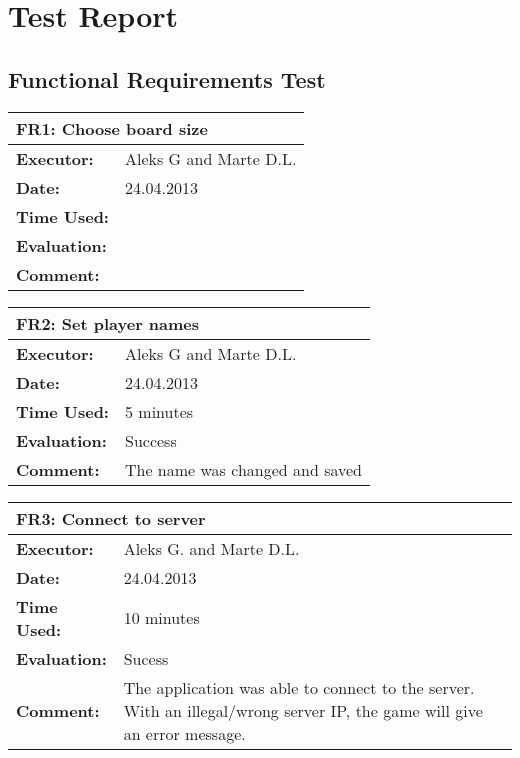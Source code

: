 \section{Test Report}
\label{testreport}

\subsection{Functional Requirements Test}

\begin{tabular}{|m{}||m{}|}
\hline
\multicolumn{2}{|l|}{FR1: Choose board size} \\ \hline
\textbf{Executor:} & Aleks G and Marte D.L.\\ \hline
\textbf{Date:} & 24.04.2013\\ \hline
\textbf{Time Used:} & \\ \hline
\textbf{Evaluation:} & \\ \hline
\textbf{Comment:} & \\ \hline
\end{tabular}

\begin{tabular}{|m{}||m{}|}
\hline
\multicolumn{2}{|l|}{FR2: Set player names} \\ \hline
\textbf{Executor:} & Aleks G and Marte D.L.\\ \hline
\textbf{Date:} & 24.04.2013\\ \hline
\textbf{Time Used:} & 5 minutes\\ \hline
\textbf{Evaluation:} & Success\\ \hline
\textbf{Comment:} & The name was changed and saved\\ \hline
\end{tabular}

\begin{tabular}{|m{}||m{}|}
\hline
\multicolumn{2}{|l|}{FR3: Connect to server} \\ \hline
\textbf{Executor:} & Aleks G. and Marte D.L.\\ \hline
\textbf{Date:} & 24.04.2013\\ \hline
\textbf{Time Used:} & 10 minutes\\ \hline
\textbf{Evaluation:} & Sucess\\ \hline
\textbf{Comment:} & The application was able to connect to the server. With an illegal/wrong server IP, the game will give an error message.\\ \hline
\end{tabular}

